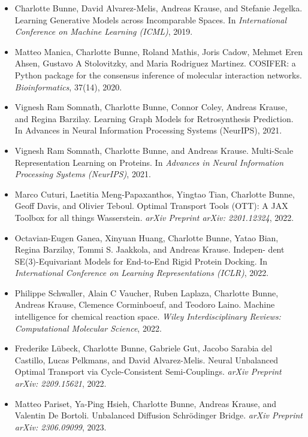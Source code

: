 \begin{itemize}
	\item[] Charlotte Bunne, David Alvarez-Melis, Andreas Krause, and Stefanie Jegelka. Learning Generative Models across Incomparable Spaces. In \textit{International Conference on Machine Learning (ICML)}, 2019.
	\item[] Matteo Manica, Charlotte Bunne, Roland Mathis, Joris Cadow, Mehmet Eren Ahsen, Gustavo A Stolovitzky, and Maria Rodriguez Martinez. COSIFER: a Python package for the consensus inference of molecular interaction networks. \textit{Bioinformatics}, 37(14), 2020.
	\item[] Vignesh Ram Somnath, Charlotte Bunne, Connor Coley, Andreas Krause, and Regina Barzilay. Learning Graph Models for Retrosynthesis Prediction. In Advances in Neural Information Processing Systems (NeurIPS), 2021.
	\item[] Vignesh Ram Somnath, Charlotte Bunne, and Andreas Krause. Multi-Scale Representation Learning on Proteins. In \textit{Advances in Neural Information Processing Systems (NeurIPS)}, 2021.
	\item[] Marco Cuturi, Laetitia Meng-Papaxanthos, Yingtao Tian, Charlotte Bunne, Geoff Davis, and Olivier Teboul. Optimal Transport Tools (OTT): A JAX Toolbox for all things Wasserstein. \textit{arXiv Preprint arXiv: 2201.12324}, 2022.
	\item[] Octavian-Eugen Ganea, Xinyuan Huang, Charlotte Bunne, Yatao Bian, Regina Barzilay, Tommi S. Jaakkola, and Andreas Krause. Indepen- dent SE(3)-Equivariant Models for End-to-End Rigid Protein Docking. In \textit{International Conference on Learning Representations (ICLR)}, 2022.
	\item[] Philippe Schwaller, Alain C Vaucher, Ruben Laplaza, Charlotte Bunne, Andreas Krause, Clemence Corminboeuf, and Teodoro Laino. Machine intelligence for chemical reaction space. \textit{Wiley Interdisciplinary Reviews: Computational Molecular Science}, 2022.
	\item[] Frederike L\"ubeck, Charlotte Bunne, Gabriele Gut, Jacobo Sarabia del Castillo, Lucas Pelkmans, and David Alvarez-Melis. Neural Unbalanced Optimal Transport via Cycle-Consistent Semi-Couplings. \textit{arXiv Preprint arXiv: 2209.15621}, 2022.
	\item[] Matteo Pariset, Ya-Ping Hsieh, Charlotte Bunne, Andreas Krause, and Valentin De Bortoli. Unbalanced Diffusion Schr{\"o}dinger Bridge. \textit{arXiv Preprint arXiv: 2306.09099}, 2023.
\end{itemize}

